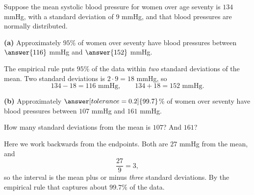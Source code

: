 \documentclass[12pt]{ximera}
\begin{document}
\begin{problem}
Suppose the mean systolic blood pressure for women over age seventy is $134$ mmHg,
with a standard deviation of $9$ mmHg, and that blood pressures are normally
distributed.

\begin{prompt}
\textbf{(a)} Approximately $95\%$ of women over seventy have blood pressures between
$\answer{116}$ mmHg and $\answer{152}$ mmHg.

\begin{solution}
The empirical rule puts $95\%$ of the data within \emph{two} standard deviations of
the mean. Two standard deviations is $2 \cdot 9 = 18$ mmHg, so
\[
134 - 18 = 116 \text{ mmHg}, \qquad 134 + 18 = 152 \text{ mmHg}.
\]
\end{solution}
\end{prompt}

\begin{prompt}
\textbf{(b)} Approximately $\answer[tolerance=0.2]{99.7}$\% of women over seventy
have blood pressures between $107$ mmHg and $161$ mmHg.

\begin{hint}
How many standard deviations from the mean is $107$? And $161$?
\end{hint}

\begin{solution}
Here we work backwards from the endpoints. Both are $27$ mmHg from the mean, and
\[
\frac{27}{9} = 3,
\]
so the interval is the mean plus or minus \emph{three} standard deviations. By the
empirical rule that captures about $99.7\%$ of the data.
\end{solution}
\end{prompt}
\end{problem}
\end{document}
